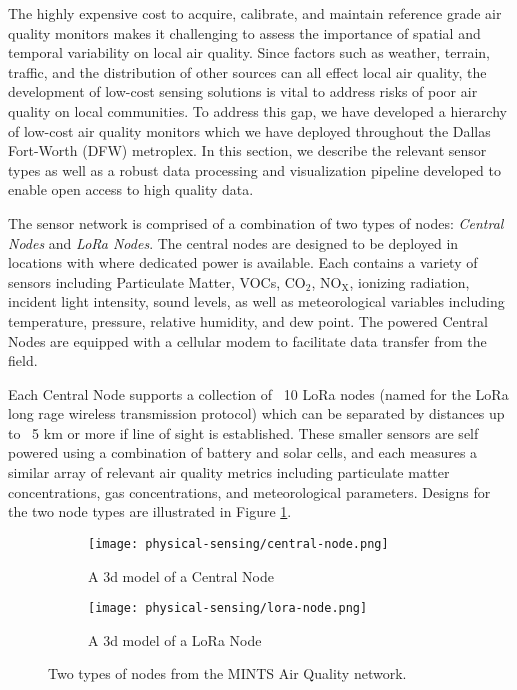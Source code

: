 The highly expensive cost to acquire, calibrate, and maintain reference grade air quality monitors makes it challenging to assess the importance of spatial and temporal variability on local air quality. Since factors such as weather, terrain, traffic, and the distribution of other sources can all effect local air quality, the development of low-cost sensing solutions is vital to address risks of poor air quality on local communities. To address this gap, we have developed a hierarchy of low-cost air quality monitors which we have deployed throughout the Dallas Fort-Worth (DFW) metroplex. In this section, we describe the relevant sensor types as well as a robust data processing and visualization pipeline developed to enable open access to high quality data.

The sensor network is comprised of a combination of two types of nodes: \textit{Central Nodes} and \textit{LoRa Nodes}. The central nodes are designed to be deployed in locations with where dedicated power is available. Each contains a variety of sensors including Particulate Matter, VOCs, $\mathrm{CO_2}$, $\mathrm{NO_X}$, ionizing radiation, incident light intensity, sound levels, as well as meteorological variables including temperature, pressure, relative humidity, and dew point. The powered Central Nodes are equipped with a cellular modem to facilitate data transfer from the field.

Each Central Node supports a collection of ~10 LoRa nodes (named for the LoRa long rage wireless transmission protocol) which can be separated by distances up to ~5 km or more if line of sight is established. These smaller sensors are self powered using a combination of battery and solar cells, and each measures a similar array of relevant air quality metrics including particulate matter concentrations, gas concentrations, and meteorological parameters. Designs for the two node types are illustrated in Figure \ref{fig:mints-nodes}.
\begin{figure}[!hbt]
  \begin{subfigure}{.5\textwidth}
    \centering
    \texttt{[image: physical-sensing/central-node.png]}
    \caption{A 3d model of a Central Node}
  \end{subfigure}
  \begin{subfigure}{.5\textwidth}
    \centering
    \texttt{[image: physical-sensing/lora-node.png]}
    \caption{A 3d model of a LoRa Node}
  \end{subfigure}
  \caption{Two types of nodes from the MINTS Air Quality network.}
  \label{fig:mints-nodes}
\end{figure}

